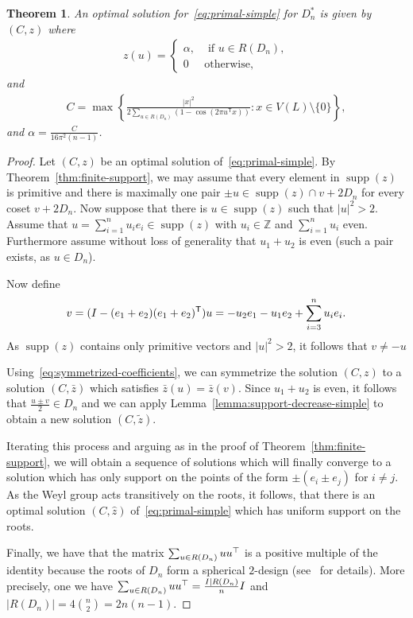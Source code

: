 \documentclass{amsart}
\newtheorem{theorem}[defin]{Theorem}
\newcommand{\Z}{\mathbb{Z}}
\DeclareMathOperator{\supp}{supp}
\begin{document}
\begin{theorem}
An optimal solution for~\eqref{eq:primal-simple} for $D_n^*$ is given by $ (C,z) $ where 
	\begin{align*}
		z(u) = \begin{cases}
			\alpha, &\text{ if } u \in R(D_n) ,   \\
			0 &\text{otherwise},
		\end{cases}
	\end{align*}
	and 
	\begin{align*}
		C  = \max\left\{
		\frac{|x|^2}{2\sum_{u \in R(D_n)} (1- \cos(2\pi
			u^{\mathsf{T}}x))  } : x \in V(L)\setminus \{0\} \right\},
	\end{align*}
	and $ \alpha = \frac{C}{16 \pi^2 (n-1)}$.
      \end{theorem}
      
\begin{proof}
  Let $ (C,z) $ be an optimal solution of~\eqref{eq:primal-simple}. By
  Theorem~\ref{thm:finite-support}, we may assume that every element
  in $ \supp(z) $ is primitive and there is maximally one pair
  $ \pm u \in \supp(z) \cap v+2D_n$ for every coset $ v+2D_n $. Now
  suppose that there is $ u \in \supp(z) $ such that $ |u|^2 > 2 $.
  Assume that $ u = \sum_{i = 1}^n u_i e_i \in \supp(z)$ with
  $ u_i \in \Z $ and $ \sum_{i = 1}^n u_i $ even. Furthermore assume
  without loss of generality that $ u_1+u_2 $ is even (such a pair
  exists, as $ u \in D_n $).
	
                Now define
	\begin{align*}
		v = (I-(e_1+e_2)(e_1+e_2)^{\sf T}) u = -u_2e_1-u_1e_2 + \sum_{i =3}^n u_i e_i . 
	\end{align*}
	As $ \supp(z) $ contains only primitive vectors and $ |u|^2 > 2 $, it follows that $ v \neq -u $
	 
	Using~\eqref{eq:symmetrized-coefficients}, we can symmetrize
        the solution $ (C,z) $ to a solution $ (C,\bar{z}) $ which
        satisfies $ \bar{z}(u) = \bar{z}(v) $.  Since $ u_1+u_2 $ is
        even, it follows that $ \frac{u \pm v}{2}\in D_n$ and we can
        apply Lemma~\ref{lemma:support-decrease-simple} to obtain a
        new solution $ (C, \tilde{z}) $.
	
	Iterating this process and arguing as in the proof of
        Theorem~\ref{thm:finite-support}, we will obtain a sequence of
        solutions which will finally converge to a solution which has
        only support on the points of the form $ \pm (e_i\pm e_j) $
        for $ i \neq j $.  As the Weyl group acts transitively on the
        roots, it follows, that there is an optimal solution
        $ (C,\hat{z}) $ of~\eqref{eq:primal-simple} which has uniform
        support on the roots.
	
	Finally, we have that the matrix $ \sum_{u \in R(D_n)} uu^{\sf{\top}}$ is
        a positive multiple of the identity because the roots of
        $D_n$ form a spherical $ 2 $-design (see~\cite{Venkov2001a}
        for details). More precisely, one we have $\sum_{u \in R(D_n)} uu^{\sf{\top}} = \frac{I |R(D_n)}{n} I$ and $|R(D_n)| = 4\binom{n}{2} = 2n(n-1)$.
\end{proof}
\end{document}
